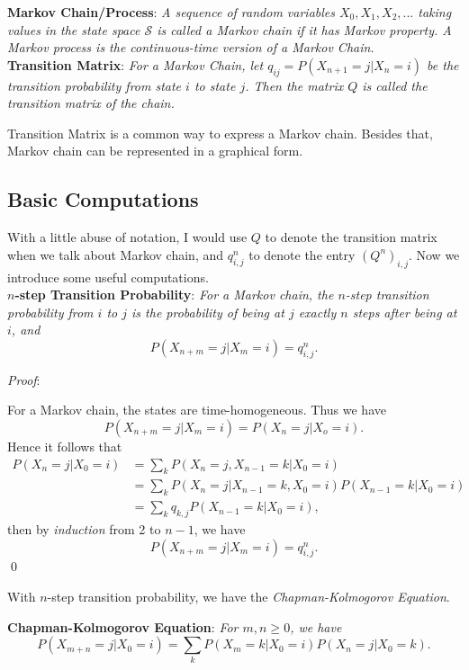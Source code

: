 \documentclass{progartcn}
\begin{document}
			\textbf{Markov Chain/Process}: \textit{A sequence of random variables $X_0, X_1, X_2, ...$ taking values in the state space $\mathcal{S}$ is called a Markov chain if it has Markov property. A Markov process is the continuous-time version of a Markov Chain.}\\

			\textbf{Transition Matrix}: \textit{For a Markov Chain, let $q_{ij}=P(X_{n+1}=j|X_n=i)$ be the transition probability from state $i$ to state $j$. Then the matrix $Q$ is called the transition matrix of the chain.}

			Transition Matrix is a common way to express a Markov chain. Besides that, Markov chain can be represented in a graphical form.\\

	\subsection{Basic Computations}

			With a little abuse of notation, I would use $Q$ to denote the transition matrix when we talk about Markov chain, and $q^n_{i,j}$ to denote the entry $(Q^n)_{i,j}$. Now we introduce some useful computations.\\

			\textbf{$n$-step Transition Probability}: \textit{For a Markov chain, the $n$-step transition probability from $i$ to $j$ is the probability of being at $j$ exactly $n$ steps after being at $i$, and}
			\[P(X_{n+m}=j|X_m=i)=q^n_{i,j}.\]

			\textit{Proof}:

			For a Markov chain, the states are time-homogeneous. Thus we have 
			\[P(X_{n+m}=j|X_m=i)=P(X_n=j|X_o=i).\]
			Hence it follows that
			\begin{align*}
			P(X_n=j|X_0=i)&=\sum_k P(X_n=j, X_{n-1}=k | X_0=i )\tag{by LOTP}\\
			&=\sum_k P(X_n=j|X_{n-1}=k, X_0=i)P(X_{n-1}=k|X_0=i)\\
			&=\sum_k q_{k,j}P(X_{n-1}=k|X_0=i),\tag{by Markov Property}
			\end{align*}
			then by \textit{induction} from 2 to $n-1$, we have
			\[P(X_{n+m}=j|X_m=i)=q^n_{i,j}.\]
			\qed

			With $n$-step transition probability, we have the \textit{Chapman-Kolmogorov Equation}.

			\textbf{Chapman-Kolmogorov Equation}: \textit{For $m,n\ge 0$, we have}
			\[P(X_{m+n}=j|X_0=i)=\sum_k P(X_m=k|X_0=i)P(X_n=j|X_0=k).\]
\end{document}
